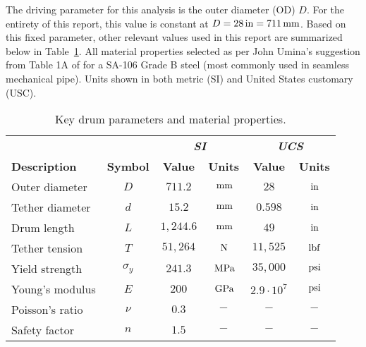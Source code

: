 \label{chapt:standards}

The driving parameter for this analysis is the outer diameter (OD) $D$. For the entirety of this report, this value is constant at $D = 28\,\mathrm{in} = 711\,\mathrm{mm}$. Based on this fixed parameter, other relevant values used in this report are summarized below in Table~\ref{table:prelim_params}. All material properties selected as per John Umina's  suggestion from Table 1A of \cite{ASMEbvpcIID} for a SA-106 Grade B steel (most commonly used in seamless mechanical pipe). Units shown in both metric (SI) and United States customary (USC).\\

\begin{table}[ht]
	\caption{Key drum parameters and material properties.}
	\centering
	\begin{tabular}{lccccc}
		&       & \multicolumn{2}{c}{\textbf{\textit{SI}}} & \multicolumn{2}{c}{\textbf{\textit{UCS}}} \\
		\textbf{Description} & \textbf{Symbol} & \textbf{Value} & \textbf{Units} & \textbf{Value}  & \textbf{Units} \\
		\midrule
		Outer diameter       & $D$           & $711.2$        & $\,\mathrm{mm}$           & $28$            & $\,\mathrm{in}$           \\
		Tether diameter      & $d$       	   & $15.2$         & $\,\mathrm{mm}$           & $0.598$         & $\,\mathrm{in}$           \\
		Drum length          & $L$             & $1,244.6$      & $\,\mathrm{mm}$           & $49$            & $\,\mathrm{in}$           \\
		Tether tension       & $T$             & $51,264$       & $\,\mathrm{N}$            & $11,525$        & $\,\mathrm{lbf}$          \\
		Yield strength       & $\sigma_y$           & $241.3$        & $\,\mathrm{MPa}$          & $35,000$        & $\,\mathrm{psi}$          \\
		Young's modulus      & $E$             & $200$          & $\,\mathrm{GPa}$          & $2.9\cdot 10^7$ & $\,\mathrm{psi}$          \\
		Poisson's ratio      & $\nu$           & $0.3$          & $-$            		& $-$             & $-$           		  \\
		Safety factor        & $n$            & $1.5$          & $-$            		& $-$             & $-$            	      \\
	\end{tabular}%
	\label{table:prelim_params}
\end{table}

